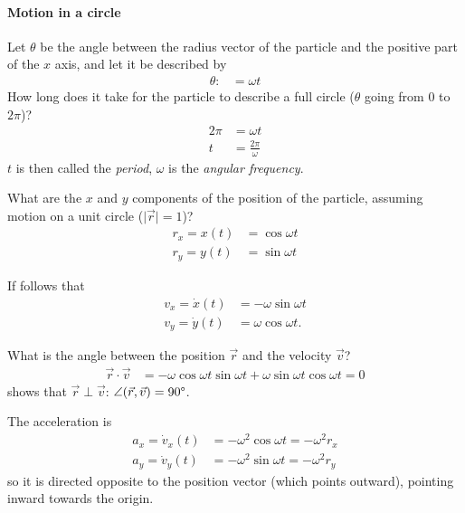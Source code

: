\documentclass[pagesize,headsepline,10pt,parskip=half]{scrreprt}
\newcommand{\abs}[1]{\lvert#1\rvert}
\begin{document}
          \paragraph{Motion in a circle}
            Let $\theta$ be the angle between the radius vector of the particle
            and the positive part of the $x$ axis, and let it be described by
            \begin{align*}
              \theta :&= \omega t
            \end{align*}
            How long does it take for the particle to describe a full circle
            ($\theta$ going from $0$ to $2 \pi$)?
            \begin{align*}
              2 \pi &= \omega t \\
              t &= \frac{2 \pi}{\omega}
            \end{align*}
            $t$ is then called the \emph{period}, $\omega$ is the \emph{angular
            frequency}.

            What are the $x$ and $y$ components of the position of the particle,
            assuming motion on a unit circle ($\abs{\vec r} = 1$)?
            \begin{align*}
              r_x = x(t) &= \cos{\omega t} \\
              r_y = y(t) &= \sin{\omega t}
            \end{align*}

            If follows that
            \begin{align*}
              v_x = \dot x(t) &= -\omega \sin{\omega t} \\
              v_y = \dot y(t) &= \omega \cos{\omega t}.
            \end{align*}

            What is the angle between the position $\vec r$ and the velocity
            $\vec v$?
            \begin{align*}
              \vec r \cdot \vec v &= - \omega \cos{\omega t} \sin{\omega t} +
              \omega \sin{\omega t} \cos{\omega t} = 0
            \end{align*}
            shows that $\vec r \perp \vec v$: $\angle(\vec r, \vec v) =
            90\degree$.

            The acceleration is
            \begin{align*}
              a_x = \dot v_x(t) &= - \omega^2 \cos{\omega t} = - \omega^2 r_x \\
              a_y = \dot v_y(t) &= - \omega^2 \sin{\omega t} = - \omega^2 r_y
            \end{align*}
            so it is directed opposite to the position vector (which points
            outward), pointing inward towards the origin.
\end{document}
